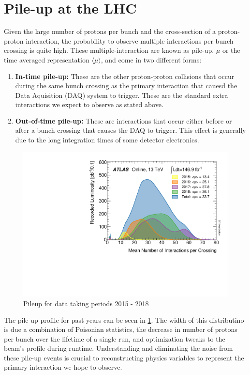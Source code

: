 \section{Pile-up at the LHC} \label{sec:lhc:pileup}

Given the large number of protons per bunch and the cross-section of a
proton-proton interaction, the probability to observe multiple interactions per
bunch crossing is quite high.  These multiple-interaction are known as pile-up,
$\mu$ or the time averaged representation $\langle \mu \rangle$, and come in two
different forms: 

\begin{enumerate} \item \textbf{In-time pile-up:} These are the other
proton-proton collisions that occur during the same bunch crossing as the
primary interaction that cauesd the Data Aquisition (DAQ) system to trigger.
These are the standard extra interactions we expect to observe as stated above.
\item \textbf{Out-of-time pile-up:} These are interactions that occur either
before or after a bunch crossing that causes the DAQ to trigger.  This effect is
generally due to the long integration times of some detector electronics.
\end{enumerate}

\begin{figure}[!htbp] 
  \begin{center}
    \includegraphics[width=0.9\linewidth]{figures/lhc/pileup.pdf}
    \caption{ Pileup for data taking periods 2015 - 2018} 
    \label{fig:pileup} 
  \end{center} 
\end{figure}

The pile-up profile for past years can be seen in \cref{fig:pileup}.  The width of this
distributino is due a combination of Poisonian statistics, the decrease in
number of protons per bunch over the lifetime of a single run, and optimization
tweaks to the beam's profile during runtime.  Understanding and eliminating the
noise from these pile-up events is crucial to reconstructing physics variables
to represent the primary interaction we hope to observe.
